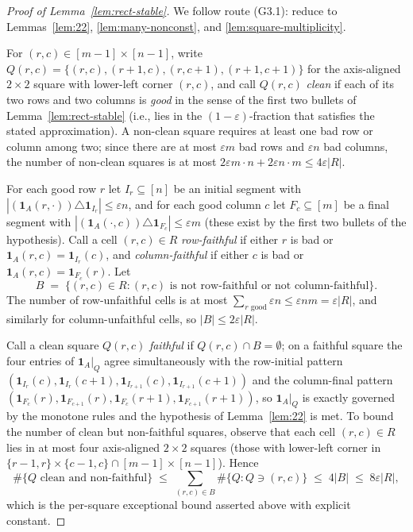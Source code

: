\begin{proof}[Proof of Lemma~\ref{lem:rect-stable}]
We follow route (G3.1): reduce to Lemmas~\ref{lem:22},
\ref{lem:many-nonconst}, and \ref{lem:square-multiplicity}.

For $(r,c)\in[m{-}1]\times[n{-}1]$, write
$Q(r,c)=\{(r,c),(r{+}1,c),(r,c{+}1),(r{+}1,c{+}1)\}$ for the
axis-aligned $2\times2$ square with lower-left corner $(r,c)$, and call
$Q(r,c)$ \emph{clean} if each of its two rows and two columns is
\emph{good} in the sense of the first two bullets of
Lemma~\ref{lem:rect-stable} (i.e., lies in the $(1{-}\varepsilon)$-fraction
that satisfies the stated approximation). A non-clean square requires at
least one bad row or column among two; since there are at most
$\varepsilon m$ bad rows and $\varepsilon n$ bad columns, the number of
non-clean squares is at most
$2\varepsilon m\cdot n + 2\varepsilon n\cdot m \le 4\varepsilon|R|$.

For each good row $r$ let $I_r\subseteq[n]$ be an initial segment with
$|(\mathbf 1_A(r,\cdot))\triangle\mathbf 1_{I_r}|\le\varepsilon n$, and for each
good column $c$ let $F_c\subseteq[m]$ be a final segment with
$|(\mathbf 1_A(\cdot,c))\triangle\mathbf 1_{F_c}|\le\varepsilon m$ (these
exist by the first two bullets of the hypothesis). Call a cell $(r,c)\in R$
\emph{row-faithful} if either $r$ is bad or $\mathbf 1_A(r,c)=\mathbf 1_{I_r}(c)$,
and \emph{column-faithful} if either $c$ is bad or
$\mathbf 1_A(r,c)=\mathbf 1_{F_c}(r)$. Let
\[
B\;=\;\{(r,c)\in R:(r,c)\text{ is not row-faithful or not column-faithful}\}.
\]
The number of row-unfaithful cells is at most
$\sum_{r\text{ good}}\varepsilon n\le\varepsilon nm=\varepsilon|R|$, and
similarly for column-unfaithful cells, so $|B|\le 2\varepsilon|R|$.

Call a clean square $Q(r,c)$ \emph{faithful} if $Q(r,c)\cap B=\emptyset$;
on a faithful square the four entries of $\mathbf 1_A|_Q$ agree
simultaneously with the row-initial pattern $(\mathbf 1_{I_r}(c),\mathbf 1_{I_r}(c{+}1),
\mathbf 1_{I_{r+1}}(c),\mathbf 1_{I_{r+1}}(c{+}1))$ and the column-final pattern
$(\mathbf 1_{F_c}(r),\mathbf 1_{F_{c+1}}(r),\mathbf 1_{F_c}(r{+}1),\mathbf 1_{F_{c+1}}(r{+}1))$,
so $\mathbf 1_A|_Q$ is exactly governed by the monotone rules and the
hypothesis of Lemma~\ref{lem:22} is met. To bound the number of clean but
non-faithful squares, observe that each cell $(r,c)\in R$ lies in at most four
axis-aligned $2\times2$ squares (those with lower-left corner in
$\{r{-}1,r\}\times\{c{-}1,c\}\cap[m{-}1]\times[n{-}1]$). Hence
\[
\#\bigl\{Q\text{ clean and non-faithful}\bigr\}
\;\le\;\sum_{(r,c)\in B}\#\{Q:Q\ni(r,c)\}
\;\le\;4|B|\;\le\;8\varepsilon|R|,
\]
which is the per-square exceptional bound asserted above with explicit
constant.


\end{proof}
